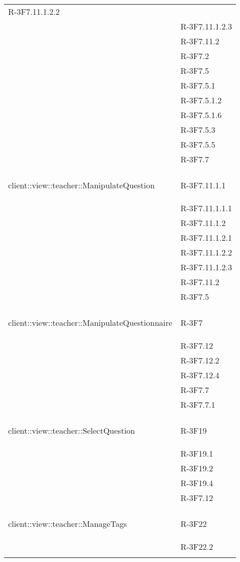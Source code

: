 \begin{longtable}{l p{3cm}}
	R-3F7.11.1.2.2 \tabularnewline &
	
	R-3F7.11.1.2.3 \tabularnewline &
	
	R-3F7.11.2 \tabularnewline &
	
	R-3F7.2 \tabularnewline &
	
	R-3F7.5 \tabularnewline &
	
	R-3F7.5.1 \tabularnewline &
	
	R-3F7.5.1.2 \tabularnewline &
	
	R-3F7.5.1.6 \tabularnewline &
	
	R-3F7.5.3 \tabularnewline &
	
	R-3F7.5.5 \tabularnewline &
	
	R-3F7.7 \tabularnewline &\tabularnewline
	\hline
	\hypertarget{client::view::teacher::ManipulateQuestion}{client::view::teacher::ManipulateQuestion} & R-3F7.11.1.1 \tabularnewline &
	
	R-3F7.11.1.1.1 \tabularnewline &
	
	R-3F7.11.1.2 \tabularnewline &
	
	R-3F7.11.1.2.1 \tabularnewline &
	
	R-3F7.11.1.2.2 \tabularnewline &
	
	R-3F7.11.1.2.3 \tabularnewline &
	
	R-3F7.11.2 \tabularnewline &
	
	R-3F7.5 \tabularnewline &\tabularnewline
	\hline
	\hypertarget{client::view::teacher::ManipulateQuestionnaire}{client::view::teacher::ManipulateQuestionnaire} & R-3F7 \tabularnewline &
	
	R-3F7.12 \tabularnewline &
	
	R-3F7.12.2 \tabularnewline &
	
	R-3F7.12.4 \tabularnewline &
	
	R-3F7.7 \tabularnewline &
	
	R-3F7.7.1 \tabularnewline &\tabularnewline
	\hline
	\hypertarget{client::view::teacher::SelectQuestion}{client::view::teacher::SelectQuestion} & R-3F19 \tabularnewline &
	
	R-3F19.1 \tabularnewline &
	
	R-3F19.2 \tabularnewline &
	
	R-3F19.4 \tabularnewline &
	
	R-3F7.12 \tabularnewline &\tabularnewline
	\hline
	\hypertarget{client::view::teacher::ManageTags}{client::view::teacher::ManageTags} & R-3F22 \tabularnewline &
	
	R-3F22.2 \tabularnewline &
	

\end{longtable}
